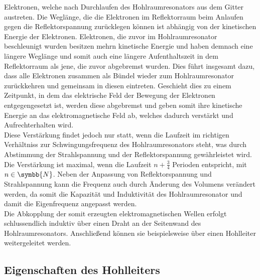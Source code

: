 Elektronen, welche nach Durchlaufen des Hohlraumresonators aus dem Gitter austreten. Die Weglänge, die die
Elektronen im Reflektorraum beim Anlaufen gegen die Reflektorspannung zurücklegen können ist abhängig von der kinetischen
Energie der Elektronen. Elektronen, die zuvor im Hohlraumresonator beschleunigt wurden besitzen mehrn kinetische
Energie und haben demnach eine längere Weglänge und somit auch eine längere Aufenthaltszeit in dem Reflektorraum
als jene, die zuvor abgebremst wurden. Dies führt insgesamt dazu, dass alle Elektronen zusammen als
Bündel wieder zum Hohlraumresonator zurückkehren und gemeinsam in diesen eintreten. Geschieht dies zu einem
Zeitpunkt, in dem das elektrische Feld der Bewegung der Elektronen entgegengesetzt ist, werden diese abgebremst
und geben somit ihre kinetische Energie an das elektromagnetische Feld ab, welches dadurch verstärkt und
Aufrechterhalten wird. \\
Diese Verstärkung findet jedoch nur statt, wenn die Laufzeit im richtigen Verhältniss zur Schwingungsfrequenz des
Hohlraumresonators steht, was durch Abstimmung der Strahlspannung und der Reflektorspannung gewährleistet wird.
Die Verstärkung ist maximal, wenn die Laufzeit $n+\frac{3}{4}$ Perioden entspricht, mit $ n \in \symbb{N}$.
Neben der Anpassung von Reflektorspannung und Strahlspannung kann die Frequenz auch durch Änderung des
Volumens verändert werden, da somit die Kapazität und Induktivität des Hohlraumresonator und damit die
Eigenfrequenz angepasst werden. \\
Die Abkopplung der somit erzeugten elektromagnetischen Wellen erfolgt schlussendlich induktiv über einen Draht an der
Seitenwand des Hohlraumresonators. Anschließend können sie beispielsweise über einen Hohlleiter weitergeleitet werden.


\subsection{Eigenschaften des Hohlleiters}

